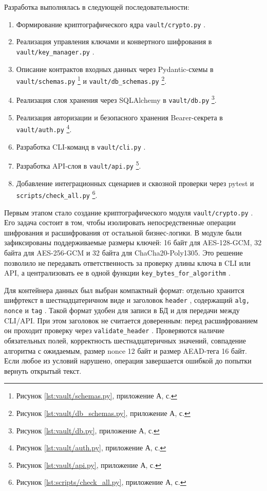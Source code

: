 \documentclass[14pt, a4paper]{extarticle}
\newcommand{\listingsappendix}{А}
\newcommand{\listingfootnote}[1]{\footnote{Рисунок \ref{#1}, приложение \listingsappendix{}, с. \pageref{#1}}}
\renewcommand{\texttt}[1]{%
  {\def\UrlFont{\ttfamily}\nolinkurl{#1}}%
}
\begin{document}
	Разработка выполнялась в следующей последовательности:
	
	\begin{enumerate}
	\item Формирование криптографического ядра \texttt{vault/crypto.py}.
	\item Реализация управления ключами и конвертного шифрования в \texttt{vault/key\_manager.py}.
	\item Описание контрактов входных данных через Pydantic-схемы в \texttt{vault/schemas.py}\listingfootnote{lst:vault/schemas.py} и \texttt{vault/db\_schemas.py}\listingfootnote{lst:vault/db_schemas.py}.
	\item Реализация слоя хранения через SQLAlchemy в \texttt{vault/db.py}\listingfootnote{lst:vault/db.py}.
	\item Реализация авторизации и безопасного хранения Bearer-секрета в \texttt{vault/auth.py}\listingfootnote{lst:vault/auth.py}.
	\item Разработка CLI-команд в \texttt{vault/cli.py}.
	\item Разработка API-слоя в \texttt{vault/api.py}\listingfootnote{lst:vault/api.py}.
	\item Добавление интеграционных сценариев и сквозной проверки через pytest и \texttt{scripts/check\_all.py}\listingfootnote{lst:scripts/check_all.py}.
	\end{enumerate}
	
	Первым этапом стало создание криптографического модуля \texttt{vault/crypto.py}. Его задача состоит в том, чтобы изолировать непосредственные операции шифрования и расшифрования от остальной бизнес-логики. В модуле были зафиксированы поддерживаемые размеры ключей: 16 байт для AES-128-GCM, 32 байта для AES-256-GCM и 32 байта для ChaCha20-Poly1305. Это решение позволило не передавать ответственность за проверку длины ключа в CLI или API, а централизовать ее в одной функции \texttt{key\_bytes\_for\_algorithm}.
	
	Для контейнера данных был выбран компактный формат: отдельно хранится шифртекст в шестнадцатеричном виде и заголовок \texttt{header}, содержащий \texttt{alg, nonce} и \texttt{tag}. Такой формат удобен для записи в БД и для передачи между CLI/API. При этом заголовок не считается доверенным: перед расшифрованием он проходит проверку через \texttt{validate\_header}. Проверяются наличие обязательных полей, корректность шестнадцатеричных значений, совпадение алгоритма с ожидаемым, размер nonce 12 байт и размер AEAD-тега 16 байт. Если любое из условий нарушено, операция завершается ошибкой до попытки вернуть открытый текст.
	
\end{document}
